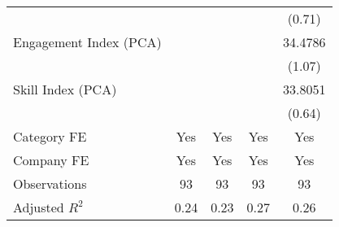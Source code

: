 {\begin{tabular}{l*{4}{c}}
                                   &                   &                   &                   &    (0.71)         \\
[1em]
Engagement Index (PCA)             &                   &                   &                   &   34.4786         \\
                                   &                   &                   &                   &    (1.07)         \\
[1em]
Skill Index (PCA)                  &                   &                   &                   &   33.8051         \\
                                   &                   &                   &                   &    (0.64)         \\
[1em]
Category FE                        &       Yes         &       Yes         &       Yes         &       Yes         \\
[1em]
Company FE                         &       Yes         &       Yes         &       Yes         &       Yes         \\
\hline
Observations                       &        93         &        93         &        93         &        93         \\
Adjusted \(R^{2}\)                 &      0.24         &      0.23         &      0.27         &      0.26         \\
\hline\hline
\end{tabular}
}
